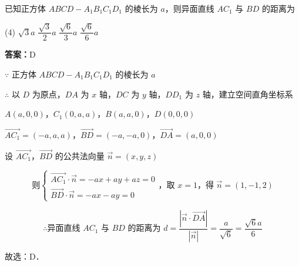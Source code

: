 \begin{example}[\bkstar{3}{5}]
已知正方体 $ABCD-A_1B_1C_1D_1$ 的棱长为 $a$，则异面直线 $AC_1$ 与 $BD$ 的距离为
\begin{tasks}(4)
    \task $\sqrt{3}a$
    \task $\dfrac{\sqrt{3}}{2}a$
    \task $\dfrac{\sqrt{6}}{3}a$
    \task $\dfrac{\sqrt{6}}{6}a$
\end{tasks}
\end{example}
\begin{solution}
\textbf{答案：}D

$\because$ 正方体 $ABCD-A_1B_1C_1D_1$ 的棱长为 $a$

$\therefore$ 以 $D$ 为原点，$DA$ 为 $x$ 轴，$DC$ 为 $y$ 轴，$DD_1$ 为 $z$ 轴，建立空间直角坐标系

$A(a,0,0)$，$C_1(0,a,a)$，$B(a,a,0)$，$D(0,0,0)$

$\overrightarrow{AC_1}=(-a,a,a)$，$\overrightarrow{BD}=(-a,-a,0)$，$\overrightarrow{DA}=(a,0,0)$

设 $\overrightarrow{AC_1}$，$\overrightarrow{BD}$ 的公共法向量 $\overrightarrow{n}=(x,y,z)$

$$
\text{则}\left\{\begin{array}{l}
\overrightarrow{AC_1}\cdot\overrightarrow{n}=-ax+ay+az=0\\
\overrightarrow{BD}\cdot\overrightarrow{n}=-ax-ay=0
\end{array}\right.\text{，取 }x=1\text{，得 }\overrightarrow{n}=(1,-1,2)
$$

$$
\therefore\text{异面直线 }AC_1\text{ 与 }BD\text{ 的距离为 }d=\dfrac{\left|\overrightarrow{n}\cdot\overrightarrow{DA}\right|}{\left|\overrightarrow{n}\right|}=\dfrac{a}{\sqrt{6}}=\dfrac{\sqrt{6}a}{6}
$$

故选：D．
\end{solution}

\vspace{2em}

